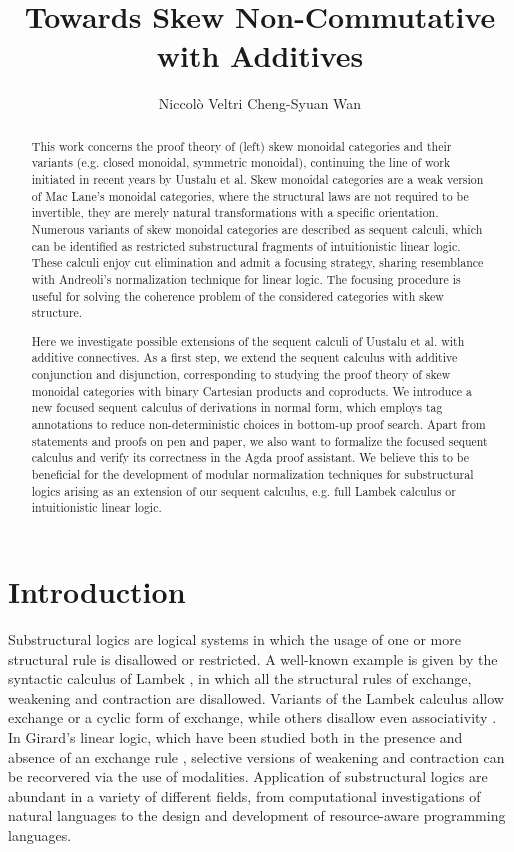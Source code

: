 \documentclass[submission,copyright,creativecommons]{eptcs}
\title{Towards Skew Non-Commutative \MILL \text{ }with Additives}
\author{
Niccol{\`o} Veltri \qquad\qquad Cheng-Syuan Wan
\institute{Tallinn University of Technology, Estonia}
\email{\quad niccolo@cs.ioc.ee \quad\qquad cswan@cs.ioc.ee}
}
\theoremstyle{definition}
\begin{document}
\maketitle
\begin{abstract}
This work concerns the proof theory of (left) skew monoidal categories and their variants (e.g. closed monoidal, symmetric monoidal), continuing the line of work initiated in recent years by Uustalu et al.
Skew monoidal categories are a weak version of Mac Lane's monoidal categories, where the structural laws are not required to be invertible, they are merely natural transformations with a specific orientation. 
Numerous variants of skew monoidal categories are described as sequent calculi, which can be identified as restricted substructural fragments of intuitionistic linear logic. These calculi enjoy cut elimination and admit a focusing strategy, sharing resemblance with Andreoli's normalization technique for linear logic. The focusing procedure is useful for solving the coherence problem of the considered categories with skew structure.

Here we investigate possible extensions of the sequent calculi of Uustalu et al. with additive connectives. 
As a first step, we extend the sequent calculus with additive conjunction and disjunction, corresponding to studying the proof theory of skew monoidal categories with binary Cartesian products and coproducts. 
We introduce a new focused sequent calculus of derivations in normal form, which employs tag annotations to reduce non-deterministic choices in bottom-up proof search.
Apart from statements and proofs on pen and paper, we also want to formalize the focused sequent calculus and verify its correctness in the Agda proof assistant.
We believe this to be beneficial for the development of modular normalization techniques for substructural logics arising as an extension of our sequent calculus, e.g. full Lambek calculus or intuitionistic linear logic.
\end{abstract}

\section{Introduction}

Substructural logics are logical systems in which the usage of one or more structural rule is disallowed or restricted. A well-known example is given by the syntactic calculus of Lambek \cite{lambek:mathematics:58}, in which all the structural rules of exchange, weakening and contraction are disallowed. Variants of the Lambek calculus allow exchange or a cyclic form of exchange, while others disallow even associativity \cite{moot:logic:12}. In Girard's linear logic, which have been studied both in the presence and absence of an exchange rule \cite{girard:linear:87,abrusci:noncommutative:1990}, selective versions of weakening and contraction can be recorvered via the use of modalities. Application of substructural logics are abundant in a variety of different fields, from computational investigations of natural languages to the design and development of resource-aware programming languages.
\end{document}
